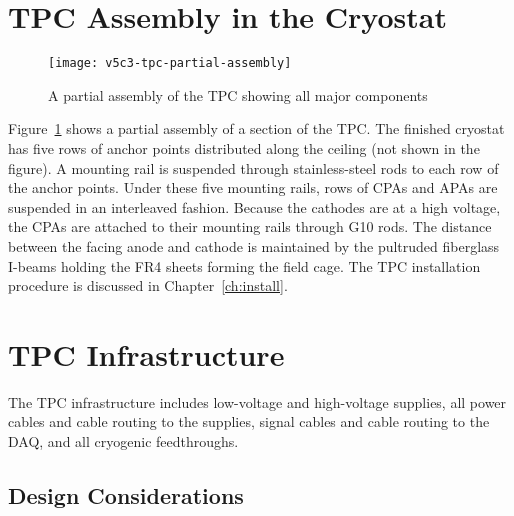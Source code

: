 \section{TPC Assembly in the Cryostat}

\begin{figure}[htbp]
\centering
\texttt{[image: v5c3-tpc-partial-assembly]}
\caption{A partial assembly of the TPC showing all major components}
\label{fig:tpc-partial-assembly}
\end{figure}

Figure~\ref{fig:tpc-partial-assembly} shows a partial assembly of a section of the TPC.
The finished cryostat has five rows of anchor points distributed along the ceiling (not shown in the figure). 
A mounting rail is suspended through stainless-steel rods to each row of the anchor points.  Under these five mounting rails, 
rows of CPAs and APAs are suspended in an interleaved fashion. 
Because the cathodes are at a high voltage, the CPAs are attached to their 
mounting rails through G10 rods. The distance between the facing anode and 
cathode is maintained by the pultruded fiberglass I-beams holding the FR4 sheets 
forming the field cage.  The TPC installation procedure 
is discussed in Chapter~\ref{ch:install}.

\section{TPC Infrastructure}
\label{sec:v5-tpc-feedthru}
   
The TPC infrastructure includes low-voltage and high-voltage supplies, all power cables and cable routing to the supplies, signal cables and cable routing to the DAQ, and all cryogenic feedthroughs.

\subsection{Design Considerations} 
\label{subsec:v5-tpc-feedthru-reqs-n-specs}


